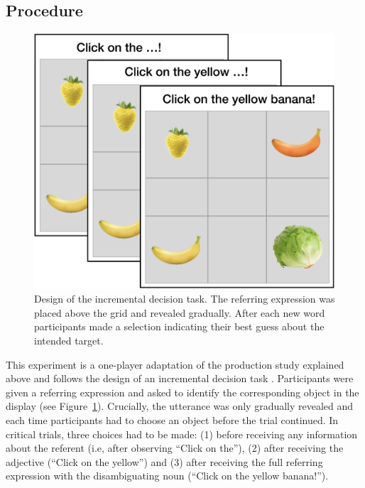 \documentclass[10pt,letterpaper]{article}
\begin{document}


\subsection{Procedure}

\begin{figure}
	\begin{center}
		\includegraphics[width=.325\textwidth]{graphs/IDT-design.pdf}
	\end{center}
\caption{Design of the incremental decision task. The referring expression was placed above the grid and revealed gradually. After each new word participants made a selection indicating their best guess about the intended target.} 
\label{IDT-design}
\end{figure}

This experiment is a one-player adaptation of the production study explained above and follows the design of an incremental decision task \cite{Qing:2018}. 
Participants were given a referring expression and asked to identify the corresponding object in the display (see Figure~\ref{IDT-design}). Crucially, the utterance was only gradually revealed and each time participants had to choose an object before the trial continued. In critical trials, three choices had to be made: (1) before receiving any information about the referent (i.e, after observing ``Click on the''), (2) after receiving the adjective (``Click on the yellow'') and (3) after receiving the full referring expression with the disambiguating noun (``Click on the yellow banana!''). 
\end{document}
